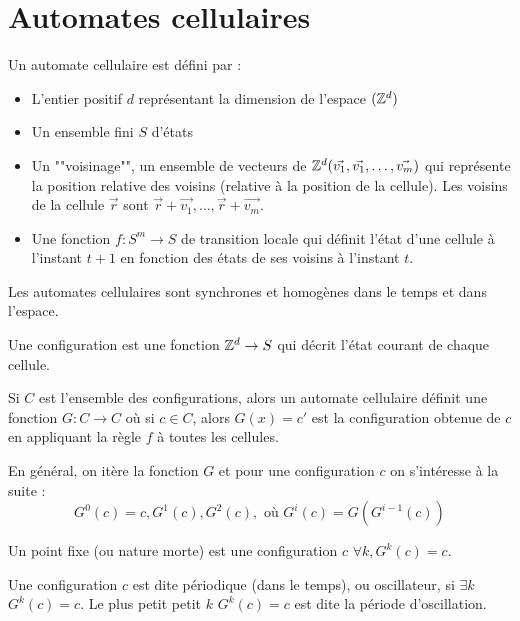\section{Automates cellulaires}

\begin{definition}
	Un automate cellulaire est défini par :
	\begin{itemize}
		\item L'entier positif $d$ représentant la dimension de l'espace $(\mathbb{Z}^d)$
		\item Un ensemble fini $S$ d'états
		\item Un ""voisinage"", \ie un ensemble de vecteurs de $\mathbb{Z}^d (\vec{v_1},  \vec{v_1}, \ldots ,\vec{v_m})$
		      qui représente la position relative des voisins (relative à la position de la cellule). Les voisins de la
		      cellule $\vec r$ sont $\vec r + \vec {v_1},  \ldots , \vec r + \vec {v_m}$.
		\item Une fonction $f : S ^ m \to S$ de transition locale qui définit l'état d'une cellule à l'instant $t + 1$
		      en fonction des états de ses voisins à l'instant $t$.
	\end{itemize}
\end{definition}

Les automates cellulaires sont synchrones et homogènes dans le temps et dans l'espace.

\begin{definition}
	Une configuration est une fonction $\mathbb{Z} ^ d \to S$ qui décrit l'état courant de chaque cellule.

	Si $C$ est l'ensemble des configurations, alors un automate cellulaire définit une fonction $G: C \to C$ où si $c \in C$, alors
	$G(x) = c'$ est la configuration obtenue de $c$ en appliquant la règle $f$ à toutes les cellules.

	En général, on itère la fonction $G$ et pour une configuration $c$ on s'intéresse à la suite :
	$$ G^0 (c) = c, G^1 (c), G^2 (c), \text{ où } G^i (c) = G ( G^{i - 1 }(c))$$
\end{definition}

\begin{definition}
	Un point fixe (ou nature morte) est une configuration $c$ \tlq $\forall k, G^k(c) = c$.
\end{definition}


\begin{definition}
	Une configuration $c$ est dite périodique (dans le temps), ou oscillateur, si $\exists k$ \tq $G^k(c) = c$. Le plus petit
	petit $k$ \tq $G^k(c) = c$ est dite la période d'oscillation.
\end{definition}

